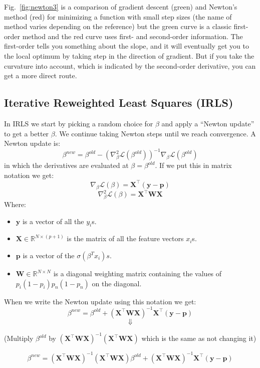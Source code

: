 \documentclass[a4paper]{article}
\begin{document}
Fig.\ \ref{fig:newton3} is a comparison of gradient descent (green) and Newton's method (red) for minimizing a function with small step sizes (the name of method varies depending on the reference) but the green curve is a classic first-order method and the red curve uses first- and second-order information. The first-order tells you something about the slope, and it will eventually get you to the local optimum by taking step in the direction of gradient. But if you take the curvature into account, which is indicated by the second-order derivative, you can get a more direct route. 


\subsection{Iterative Reweighted Least Squares (IRLS)}
In IRLS we start by picking a random choice for $\beta$ and apply a ``Newton update'' to get a better $\beta$. We continue taking Newton steps until we reach convergence. 
A Newton update is:
$$\beta^{new} = \beta^{old} - (\nabla_\beta^2 \mathcal{L}(\beta^{old}))^{-1}\nabla_\beta\mathcal{L}(\beta^{old})$$
in which the derivatives are evaluated at $\beta=\beta^{old}$.  If we put this in matrix notation we get:
$$\nabla_\beta\mathcal{L}(\beta) = \mathbf{X}^\top(\mathbf{y}-\mathbf{p})$$
$$\nabla_\beta^2 \mathcal{L}(\beta) = \mathbf{X}^\top \mathbf{W}\mathbf{X}$$
Where:
\begin{itemize}
  \item $\mathbf{y}$ is a vector of all the $y_i$s.
  \item $\mathbf{X}\in\mathbb{R}^{N\times (p+1)}$ is the matrix of all the feature vectors $x_i$s.
  \item $\mathbf{p}$ is a vector of the $\sigma (\beta^T x_i)s$.
  \item $\mathbf{W}\in\mathbb{R}^{N\times N}$ is a diagonal weighting matrix containing the values of $p_i(1 - p_i)   p_n(1-p_n)$ on the diagonal.
\end{itemize}
When we write the Newton update using this notation we get:
$$\beta^{new} = \beta^{old}+(\mathbf{X}^\top \mathbf{W}\mathbf{X})^{-1}\mathbf{X}^\top(\mathbf{y}-\mathbf{p})$$
$$\Downarrow$$
\begin{center}{(Multiply $\beta^{old}$ by $(\mathbf{X}^\top \mathbf{W}\mathbf{X})^{-1}(\mathbf{X}^\top \mathbf{W}\mathbf{X})$ which is the same as not changing it)}\end{center}
$$\beta^{new} = (\mathbf{X}^\top \mathbf{W}\mathbf{X})^{-1}(\mathbf{X}^\top \mathbf{W}\mathbf{X})\beta^{old}+(\mathbf{X}^\top \mathbf{W}\mathbf{X})^{-1}\mathbf{X}^\top(\mathbf{y}-\mathbf{p})$$
\end{document}
